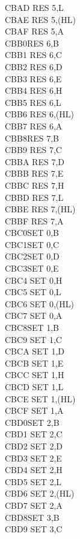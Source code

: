 \documentclass[oneside,a4paper]{book}
\begin{document}
\begin{multicols}{3}
{\begin{tabbing}
CBAD\> 	RES 5,L\\
CBAE\> 	RES 5,(HL)\\
CBAF\> 	RES 5,A\\
CBB0\>RES 6,B\\
CBB1\> 	RES 6,C\\
CBB2\> 	RES 6,D\\
CBB3\> 	RES 6,E\\
CBB4\> 	RES 6,H\\
CBB5\> 	RES 6,L\\
CBB6\> 	RES 6,(HL)\\
CBB7\> 	RES 6,A\\
CBB8\>RES 7,B\\
CBB9\> 	RES 7,C\\
CBBA\> 	RES 7,D\\
CBBB\> 	RES 7,E\\
CBBC\> 	RES 7,H\\
CBBD\> 	RES 7,L\\
CBBE\> 	RES 7,(HL)\\
CBBF\> 	RES 7,A\\
CBC0\>SET 0,B\\
CBC1\>SET 0,C\\
CBC2\>SET 0,D\\
CBC3\>SET 0,E\\
CBC4\> 	SET 0,H\\
CBC5\> 	SET 0,L\\
CBC6\> 	SET 0,(HL)\\
CBC7\> 	SET 0,A\\
CBC8\>SET 1,B\\
CBC9\> 	SET 1,C\\
CBCA\> 	SET 1,D\\
CBCB\> 	SET 1,E\\
CBCC\> 	SET 1,H\\
CBCD\> 	SET 1,L\\
CBCE\> 	SET 1,(HL)\\
CBCF\> 	SET 1,A\\
CBD0\>SET 2,B\\
CBD1\> 	SET 2,C\\
CBD2\> 	SET 2,D\\
CBD3\> 	SET 2,E\\
CBD4\> 	SET 2,H\\
CBD5\> 	SET 2,L\\
CBD6\> 	SET 2,(HL)\\
CBD7\> 	SET 2,A\\
CBD8\>SET 3,B\\
CBD9\> 	SET 3,C\\

\end{tabbing}}
\end{multicols}
\end{document}
